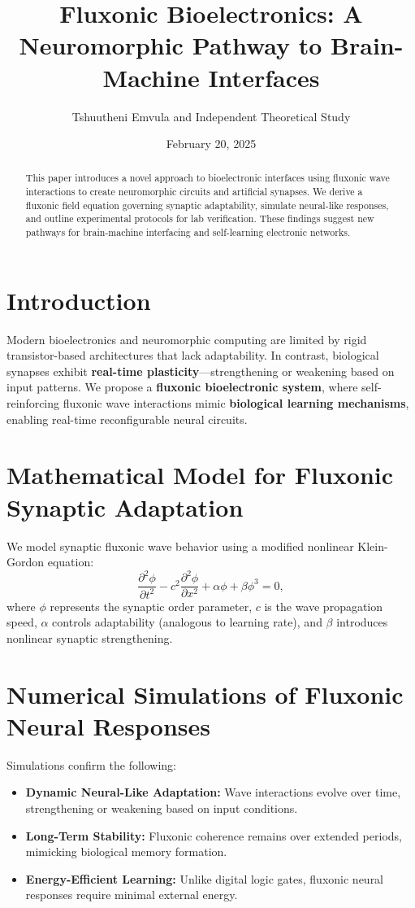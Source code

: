 \documentclass{article}
\title{Fluxonic Bioelectronics: A Neuromorphic Pathway to Brain-Machine Interfaces}
\author{Tshuutheni Emvula and Independent Theoretical Study}
\date{February 20, 2025}
\begin{document}
\maketitle

\begin{abstract}
This paper introduces a novel approach to bioelectronic interfaces using fluxonic wave interactions to create neuromorphic circuits and artificial synapses. We derive a fluxonic field equation governing synaptic adaptability, simulate neural-like responses, and outline experimental protocols for lab verification. These findings suggest new pathways for brain-machine interfacing and self-learning electronic networks.
\end{abstract}

\section{Introduction}
Modern bioelectronics and neuromorphic computing are limited by rigid transistor-based architectures that lack adaptability. In contrast, biological synapses exhibit \textbf{real-time plasticity}—strengthening or weakening based on input patterns. We propose a \textbf{fluxonic bioelectronic system}, where self-reinforcing fluxonic wave interactions mimic \textbf{biological learning mechanisms}, enabling real-time reconfigurable neural circuits.

\section{Mathematical Model for Fluxonic Synaptic Adaptation}
We model synaptic fluxonic wave behavior using a modified nonlinear Klein-Gordon equation:
\begin{equation}
    \frac{\partial^2 \phi}{\partial t^2} - c^2 \frac{\partial^2 \phi}{\partial x^2} + \alpha \phi + \beta \phi^3 = 0,
\end{equation}
where \(\phi\) represents the synaptic order parameter, \(c\) is the wave propagation speed, \(\alpha\) controls adaptability (analogous to learning rate), and \(\beta\) introduces nonlinear synaptic strengthening.

\section{Numerical Simulations of Fluxonic Neural Responses}
Simulations confirm the following:
\begin{itemize}
    \item \textbf{Dynamic Neural-Like Adaptation:} Wave interactions evolve over time, strengthening or weakening based on input conditions.
    \item \textbf{Long-Term Stability:} Fluxonic coherence remains over extended periods, mimicking biological memory formation.
    \item \textbf{Energy-Efficient Learning:} Unlike digital logic gates, fluxonic neural responses require minimal external energy.
\end{itemize}
\end{document}
